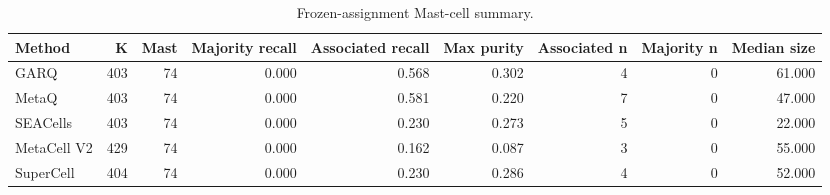 \begin{table}[ht]
\centering
\caption{Frozen-assignment Mast-cell summary.}
\begin{tabular}{lrrrrrrrr}
\toprule
Method & K & Mast & Majority recall & Associated recall & Max purity & Associated n & Majority n & Median size \\
\midrule
GARQ & 403 & 74 & 0.000 & 0.568 & 0.302 & 4 & 0 & 61.000 \\
MetaQ & 403 & 74 & 0.000 & 0.581 & 0.220 & 7 & 0 & 47.000 \\
SEACells & 403 & 74 & 0.000 & 0.230 & 0.273 & 5 & 0 & 22.000 \\
MetaCell V2 & 429 & 74 & 0.000 & 0.162 & 0.087 & 3 & 0 & 55.000 \\
SuperCell & 404 & 74 & 0.000 & 0.230 & 0.286 & 4 & 0 & 52.000 \\
\bottomrule
\end{tabular}
\end{table}
